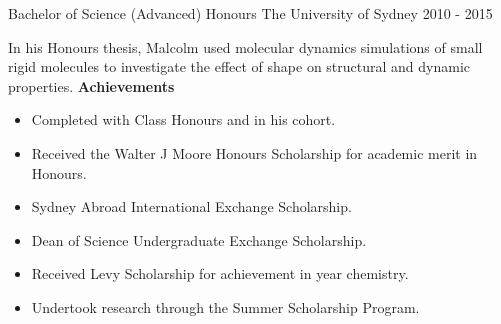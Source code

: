 \cventry
  {Bachelor of Science (Advanced) Honours} %
  {The University of Sydney} %
  {} %
  {2010 - 2015} %
{%
  In his Honours thesis,
  Malcolm used molecular dynamics simulations of small rigid molecules
  to investigate the effect of shape on structural and dynamic properties. \newline
  \textbf{Achievements}
  \begin{itemize}
    \item Completed with  Class Honours and  in his cohort.
    \item Received the Walter J Moore Honours Scholarship for academic merit in Honours.
    \item Sydney Abroad International Exchange Scholarship.
    \item Dean of Science Undergraduate Exchange Scholarship.
    \item Received Levy Scholarship for achievement in  year chemistry.
    \item Undertook research through the Summer Scholarship Program.
  \end{itemize}
}

